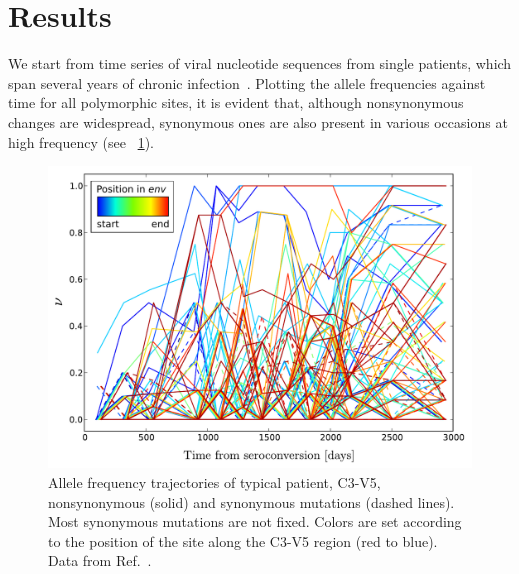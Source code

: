 \documentclass[12pt,a4paper,notitlepage,onecolumn]{article}
\begin{document}
\section{Results}
We start from time series of viral nucleotide sequences from single patients,
which span several years of chronic
infection~\citep{shankarappa_consistent_1999, bunnik_autologous_2008,
liu_selection_2006}. Plotting the allele frequencies against time for all
polymorphic sites, it is evident that, although nonsynonymous changes are
widespread, synonymous ones are also present in various occasions at high
frequency (see \figurename~\ref{fig:aft}).
\begin{figure}
\begin{center}
\includegraphics[width=\linewidth]{Shankarappa_allele_freqs_trajectories_syn_nonsynp8}
\caption{Allele frequency trajectories of typical patient, C3-V5, nonsynonymous
(solid) and synonymous mutations (dashed lines). Most synonymous mutations are
not fixed. Colors are set according to the position of the site along the C3-V5
region (red to blue). Data from Ref.~\cite{shankarappa_consistent_1999}.}
\label{fig:aft}
\end{center}
\end{figure}
\end{document}
